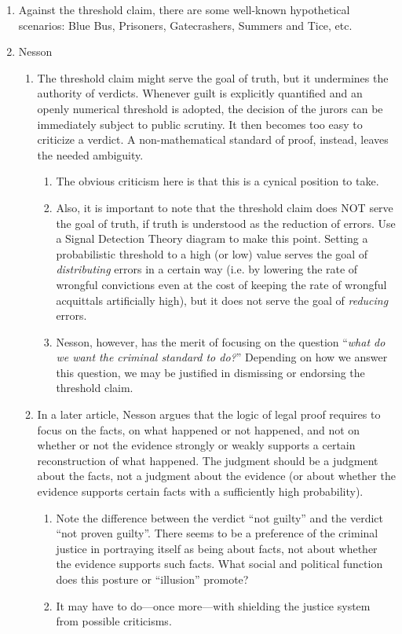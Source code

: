 \documentclass[16pt]{article}
\begin{document}
\begin{enumerate}
\begin{enumerate}
\end{enumerate}
%
\item Against the threshold claim, there are some well-known hypothetical scenarios: Blue Bus, Prisoners, Gatecrashers, Summers and Tice, etc. 
%
\item Nesson
\begin{enumerate}
\item The threshold claim might serve the goal of truth, but it undermines the authority of verdicts. Whenever guilt is explicitly quantified and an openly numerical threshold is adopted, the decision of the jurors can be immediately subject to public scrutiny. It then becomes too easy to criticize a verdict. A non-mathematical standard of proof, instead, leaves the needed ambiguity. 
\begin{enumerate}
\item The obvious criticism here is that this is a cynical position to take.
\item Also, it is important to note that the threshold claim does NOT serve the goal of truth, if truth is understood as the reduction of errors. Use a Signal Detection Theory diagram to make this point. Setting a probabilistic threshold to a high (or low) value serves the goal of \textit{distributing} errors in a certain way (i.e. by lowering the rate of wrongful convictions even at the cost of keeping the rate of wrongful acquittals artificially high), but it does not serve the goal of \textit{reducing} errors. 
\item Nesson, however, has the merit of focusing on the question ``\textit{what do we want the criminal standard to do?}'' Depending on how we answer this question, we may be justified in dismissing or endorsing the threshold claim. 
\end{enumerate}
\item In a later article, Nesson argues that the logic of legal proof requires to focus on the facts, on what happened or not happened, and not on whether or not the evidence strongly or weakly supports a certain reconstruction of what happened. The judgment should be a judgment about the facts, not a judgment about the evidence (or about whether the evidence supports certain facts with a sufficiently high probability). 
\begin{enumerate}
\item Note the difference between the verdict ``not guilty'' and the verdict ``not proven guilty''. There seems to be a preference of the criminal justice in portraying itself as being about facts, not about whether the evidence supports such facts. What social and political function does this posture or ``illusion'' promote? 
\item It may have to do---once more---with shielding the justice system from possible criticisms.
\end{enumerate}
\end{enumerate}

\end{enumerate}
\end{document}
